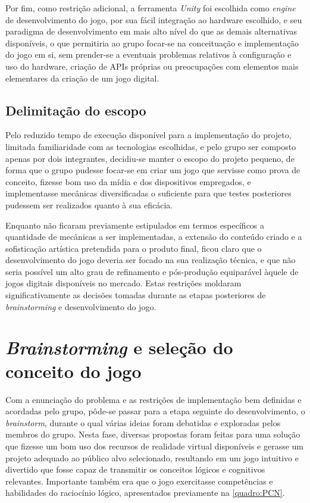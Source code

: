 Por fim, como restrição adicional, a ferramenta \textit{Unity} foi escolhida 
como \textit{engine} de desenvolvimento do jogo, por sua fácil integração 
ao hardware escolhido, e seu paradigma de desenvolvimento em mais alto nível do 
que as demais alternativas disponíveis, o que permitiria ao grupo focar-se 
na conceituação e implementação do jogo em si, sem prender-se a eventuais 
problemas relativos à configuração e uso do hardware, criação de APIs próprias 
ou preocupações com elementos mais elementares da criação de um jogo digital.

\subsection{Delimitação do escopo}\label{subsec-delimitacao-escopo}

Pelo reduzido tempo de execução disponível para a implementação do projeto,
limitada familiaridade com as tecnologias escolhidas, e pelo grupo ser
composto apenas por dois integrantes, decidiu-se manter o escopo do projeto
pequeno, de forma que o grupo pudesse focar-se em criar um jogo que servisse
como prova de conceito, fizesse bom uso da mídia e dos dispositivos empregados,
e implementasse mecânicas diversificadas o suficiente para que testes posteriores
pudessem ser realizados quanto à sua eficácia.

Enquanto não ficaram previamente estipulados em termos específicos a quantidade de
mecânicas a ser implementadas, a extensão do conteúdo criado e a sofisticação
artística pretendida para o produto final, ficou claro que o desenvolvimento do
jogo deveria ser focado na sua realização técnica, e que não seria possível um
alto grau de refinamento e pós-produção equiparável àquele de jogos digitais
disponíveis no mercado. Estas restrições moldaram significativamente as decisões
tomadas durante as etapas posteriores de \textit{brainstorming} e desenvolvimento do
jogo.

\section{\textit{Brainstorming} e seleção do conceito do jogo}\label{sec-brainstorming-conceito}

Com a enunciação do problema e as restrições de implementação bem definidas 
e acordadas pelo grupo, pôde-se passar para a etapa seguinte do desenvolvimento, 
o \textit{brainstorm}, durante o qual várias ideias foram debatidas e 
exploradas pelos membros do grupo. Nesta fase, diversas propostas foram feitas 
para uma solução que fizesse um bom uso dos recursos de realidade 
virtual disponíveis e gerasse um projeto adequado ao público alvo 
selecionado, resultando em um jogo intuitivo e divertido que fosse 
capaz de transmitir os conceitos lógicos e cognitivos relevantes.
Importante também era que o jogo exercitasse competências e 
habilidades do raciocínio lógico, apresentados previamente na 
\autoref{quadro:PCN}.

